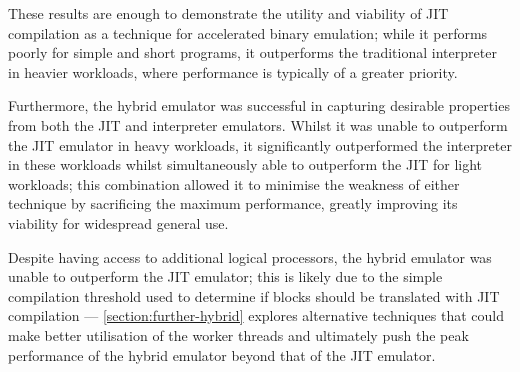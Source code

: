 These results are enough to demonstrate the utility and viability of JIT compilation as a technique for accelerated binary emulation; while it performs poorly for simple and short programs, it outperforms the traditional interpreter in heavier workloads, where performance is typically of a greater priority.

Furthermore, the hybrid emulator was successful in capturing desirable properties from both the JIT and interpreter emulators. Whilst it was unable to outperform the JIT emulator in heavy workloads, it significantly outperformed the interpreter in these workloads whilst simultaneously able to outperform the JIT for light workloads; this combination allowed it to minimise the weakness of either technique by sacrificing the maximum performance, greatly improving its viability for widespread general use.

Despite having access to additional logical processors, the hybrid emulator was unable to outperform the JIT emulator; this is likely due to the simple compilation threshold used to determine if blocks should be translated with JIT compilation — \autoref{section:further-hybrid} explores alternative techniques that could make better utilisation of the worker threads and ultimately push the peak performance of the hybrid emulator beyond that of the JIT emulator.